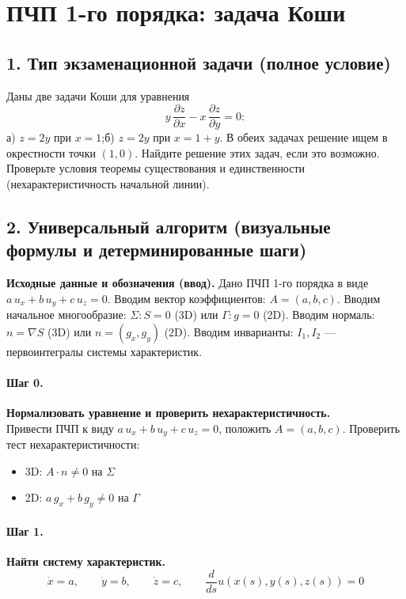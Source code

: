 \section{ПЧП 1-го порядка: задача Коши}

\subsection*{1. Тип экзаменационной задачи (полное условие)}
Даны две задачи Коши для уравнения
\[
y\,\frac{\partial z}{\partial x}-x\,\frac{\partial z}{\partial y}=0:
\]
а) \(z=2y\) при \(x=1\);\quad б) \(z=2y\) при \(x=1+y\).
В обеих задачах решение ищем в окрестности точки \((1,0)\).
Найдите решение этих задач, если это возможно. Проверьте условия теоремы существования и единственности (нехарактеристичность начальной линии).

\subsection*{2. Универсальный алгоритм (визуальные формулы и детерминированные шаги)}

\textbf{Исходные данные и обозначения (ввод).} Дано ПЧП 1-го порядка в виде \(a\,u_x+b\,u_y+c\,u_z=0\).
Вводим вектор коэффициентов: \(A=(a,b,c)\).
Вводим начальное многообразие: \(\Sigma: S=0\) (3D) или \(\Gamma: g=0\) (2D).
Вводим нормаль: \(n=\nabla S\) (3D) или \(n=(g_x,g_y)\) (2D).
Вводим инварианты: \(I_1,I_2\) — первоинтегралы системы характеристик.

\paragraph{Шаг 0.} \textbf{Нормализовать уравнение и проверить нехарактеристичность.}\\
Привести ПЧП к виду \(a\,u_x+b\,u_y+c\,u_z=0\), положить \(A=(a,b,c)\).
Проверить тест нехарактеристичности:
\begin{itemize}
\item 3D: \(A\cdot n\neq0\) на \(\Sigma\)
\item 2D: \(a\,g_x+b\,g_y\neq0\) на \(\Gamma\)
\end{itemize}

\paragraph{Шаг 1.} \textbf{Найти систему характеристик.}\\
\[
\dot x=a,\qquad \dot y=b,\qquad \dot z=c,\qquad \frac{d}{ds}u(x(s),y(s),z(s))=0
\]

